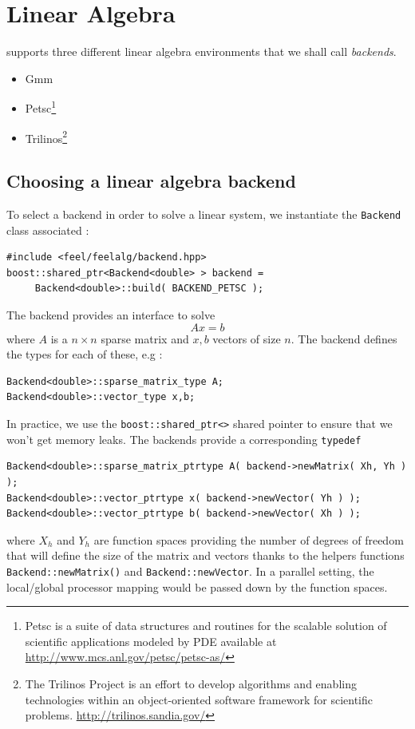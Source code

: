 \section{Linear Algebra}
\label{sec:linear-algebra}

\feel supports three different linear algebra environments that we
shall call \emph{backends}.
\begin{itemize}
\item Gmm%
\item Petsc\footnote{Petsc is a suite of data structures and routines for the scalable solution of scientific applications modeled by PDE available at \url{http://www.mcs.anl.gov/petsc/petsc-as/}}
\item Trilinos\footnote{The Trilinos Project is an effort to develop algorithms and enabling technologies within an object-oriented software framework for scientific problems. \url{http://trilinos.sandia.gov/}}
\end{itemize}


\subsection{Choosing a linear algebra backend}
\label{sec:choos-line-algebra}

To select a backend in order to solve a linear system, we instantiate
the \lstinline!Backend! class associated :
\begin{lstlisting}
#include <feel/feelalg/backend.hpp>
boost::shared_ptr<Backend<double> > backend =
     Backend<double>::build( BACKEND_PETSC );
\end{lstlisting}
The backend provides an interface to solve
\begin{equation}
  \label{eq:8}
  A x = b
\end{equation}
where $A$ is a $n \times n $ sparse matrix and $x,b$ vectors of size $n$. The backend defines the \cpp types for  each of these, e.g :
\begin{lstlisting}
Backend<double>::sparse_matrix_type A;
Backend<double>::vector_type x,b;
\end{lstlisting}
In practice, we use the \lstinline!boost::shared_ptr<>! shared pointer
to ensure that we won't get memory leaks. The backends provide a
corresponding \lstinline!typedef!

\begin{lstlisting}
Backend<double>::sparse_matrix_ptrtype A( backend->newMatrix( Xh, Yh ) );
Backend<double>::vector_ptrtype x( backend->newVector( Yh ) );
Backend<double>::vector_ptrtype b( backend->newVector( Xh ) );
\end{lstlisting}
where $X_h$ and $Y_h$ are function spaces providing the number of
degrees of freedom that will define the size of the matrix and vectors
thanks to the helpers functions \lstinline!Backend::newMatrix()! and
\lstinline!Backend::newVector!. In a parallel setting, the
local/global processor mapping would be passed down by the function
spaces.

